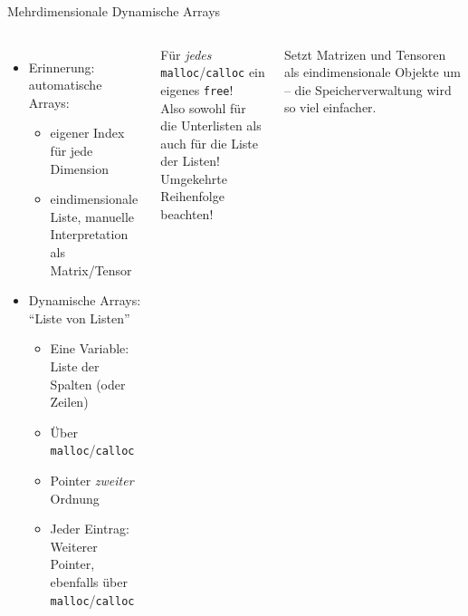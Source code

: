 \begin{frame}[fragile]{Mehrdimensionale Dynamische Arrays}
%
\begin{columns}[T]
\begin{itemize}
\item Erinnerung: automatische Arrays:
	\begin{itemize}
	\item eigener Index für jede Dimension
	\item eindimensionale Liste, manuelle Interpretation als Matrix/Tensor
	\end{itemize}
\item Dynamische Arrays: \enquote{Liste von Listen}
	\begin{itemize}
	\item Eine Variable: Liste der Spalten (oder Zeilen)
	\item Über \texttt{malloc}/\texttt{calloc}
	\item Pointer \emph{zweiter} Ordnung
	\item Jeder Eintrag: Weiterer Pointer, ebenfalls über \texttt{malloc}/\texttt{calloc}
	\end{itemize}
\end{itemize}
%
\begin{warnbox}
Für \emph{jedes} \texttt{malloc}/\texttt{calloc} ein eigenes \texttt{free}!\\
Also sowohl für die Unterlisten als auch für die Liste der Listen!\\
Umgekehrte Reihenfolge beachten!
\end{warnbox}
\begin{hintbox}
Setzt Matrizen und Tensoren als eindimensionale Objekte um -- die Speicherverwaltung wird so viel einfacher.
\end{hintbox}
\end{columns}
%
\end{frame}


